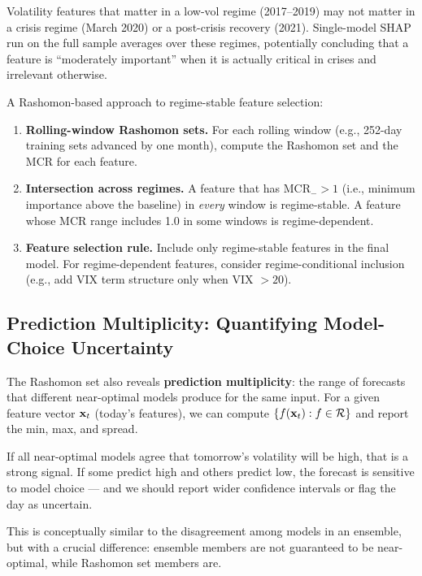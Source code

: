 Volatility features that matter in a low-vol regime (2017--2019) may not
matter in a crisis regime (March 2020) or a post-crisis recovery (2021).
Single-model SHAP run on the full sample averages over these regimes,
potentially concluding that a feature is ``moderately important'' when it is
actually critical in crises and irrelevant otherwise.

A Rashomon-based approach to regime-stable feature selection:

\begin{enumerate}[leftmargin=1.8em]
  \item \textbf{Rolling-window Rashomon sets.}  For each rolling window
    (e.g., 252-day training sets advanced by one month), compute the
    Rashomon set and the MCR for each feature.
  \item \textbf{Intersection across regimes.}  A feature that has
    $\text{MCR}_{-} > 1$ (i.e., minimum importance above the baseline) in
    \emph{every} window is regime-stable.  A feature whose MCR range
    includes 1.0 in some windows is regime-dependent.
  \item \textbf{Feature selection rule.}  Include only regime-stable
    features in the final model.  For regime-dependent features, consider
    regime-conditional inclusion (e.g., add VIX term structure only when
    VIX $> 20$).
\end{enumerate}

\subsection{Prediction Multiplicity: Quantifying Model-Choice Uncertainty}

The Rashomon set also reveals \textbf{prediction multiplicity}: the range of
forecasts that different near-optimal models produce for the same input.  For
a given feature vector $\mathbf{x}_t$ (today's features), we can compute
$\{f(\mathbf{x}_t) : f \in \mathcal{R}\}$ and report the min, max, and spread.

If all near-optimal models agree that tomorrow's volatility will be high,
that is a strong signal.  If some predict high and others predict low, the
forecast is sensitive to model choice --- and we should report wider
confidence intervals or flag the day as uncertain.

This is conceptually similar to the disagreement among models in an ensemble,
but with a crucial difference: ensemble members are not guaranteed to be
near-optimal, while Rashomon set members are.

